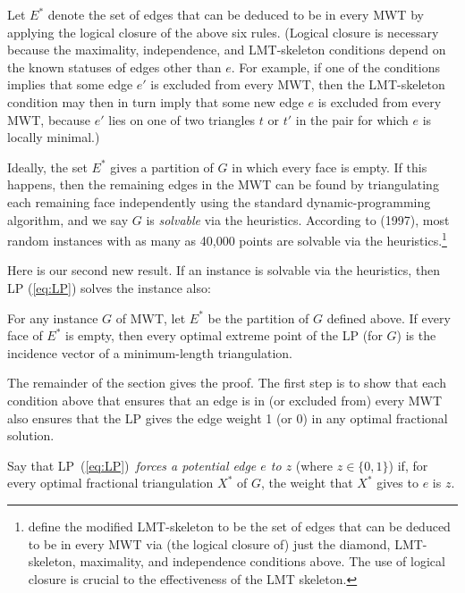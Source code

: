 \documentclass[final]{siamltex}
\newcommand{\refLP}{(\ref{eq:LP})\xspace}
\newcommand{\edge}{e}
\newcommand{\edges}{E}
\newcommand{\graph}{G}
\newcommand{\tri}{t}  \newcommand{\vertex}{v}
\newcommand{\fracTriang}{X}
\begin{document}
\noindent
Let $\edges^*$ denote the set of edges that can be deduced to be in every MWT
by applying the logical closure of the above six rules.
(Logical closure is necessary because the maximality, independence, and LMT-skeleton conditions
depend on the known statuses of edges other than $\edge$.
For example, if one of the conditions implies that some edge $\edge'$ is excluded from every MWT,
then the LMT-skeleton condition may then in turn 
imply that some new edge $\edge$ is excluded from every MWT,
because $\edge'$ lies on one of two triangles $\tri$ or $\tri'$ in the pair for which $\edge$ is locally minimal.)

Ideally, the set $\edges^*$ gives a partition of $\graph$ in which every face is empty.
If this happens, then the remaining edges in the MWT can be found
by triangulating each remaining face independently using the standard
dynamic-programming algorithm, and we say $\graph$ is {\em solvable} via the heuristics.
According to \cite{dickerson1997large} (1997),
most random instances with as many as 40,000 points are solvable via the heuristics.\footnote
{\cite{dickerson1997large} define the modified LMT-skeleton to be
the set of edges that can be deduced to be in every MWT via 
(the logical closure of) just the 
diamond, LMT-skeleton, maximality, and independence conditions above.
The use of logical closure is crucial to the effectiveness of the LMT skeleton.
}  

Here is our second new result.  If an instance is solvable via the heuristics,
then LP \refLP solves the instance also:
\begin{theorem}\label{thm:heuristics}
  For any instance $\graph$ of MWT,
  let $\edges^*$ be the partition of $\graph$ defined above.
  If every face of $\edges^*$ is empty, then every optimal extreme point of the LP (for $\graph$)
  is the incidence vector of a minimum-length triangulation.
\end{theorem}

The remainder of the section gives the proof. The first step is to show that each condition above that ensures that an edge is in
(or excluded from) every MWT also ensures that the LP gives the edge weight 1 (or 0)
in any optimal fractional solution.

Say that LP~\refLP\ {\em forces a potential edge $\edge$ to $z$} (where $z\in\{0,1\}$)
if, for every optimal fractional triangulation $\fracTriang^*$ of $\graph$,
the weight that $\fracTriang^*$ gives to $\edge$ is $z$.
\end{document}
